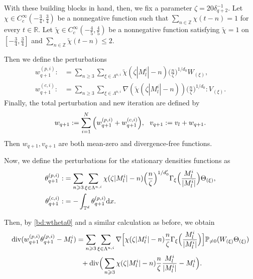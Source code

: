 \documentclass[UTF-8,reqno]{amsart}
\numberwithin{equation}{section}
\theoremstyle{definition}
\def\[{{\Big[}}
\def\]{{\Big]}}
\def\({{\Big(}}
\def\){{\Big)}}
\def\dif{{\mathord{{\rm d}}}}
\def\mP{{\mathbb P}}
\def\geq{\geqslant}
\def\leq{\leqslant}
\def\div{\mathord{{\rm div}}}
\def\[{{\Big[}}
\def\]{{\Big]}}
\def\({{\Big(}}
\def\){{\Big)}}
\def\dif{{\mathord{{\rm d}}}}
\def\geq{\geqslant}
\def\leq{\leqslant}
\def\div{\mathord{{\rm div}}}
\begin{document}
With these building blocks in hand, then, we fix a  parameter $\zeta = 20\delta_{q+2}^{-1}$.  Let
$
\chi\in C_c^\infty(-\frac34,\frac34)
$
be a nonnegative function such that
$
\sum_{n\in\mathbb{Z}}\chi(t-n)=1
$
for every $t\in\mathbb{R}$.
Let
$
\tilde{\chi}\in C_c^\infty(-\frac45,\frac45)
$
be a nonnegative function satisfying
$
\tilde{\chi}=1
$
on
$
[-\frac34,\frac34]
$
and
$
\sum_{n\in\mathbb{Z}}\tilde{\chi}(t-n)\leq2.
$

Then we define the perturbations
\begin{align*}
w_{q+1}^{(p,i)}:&=\sum_{n\geq3}\sum_{\xi\in\Lambda^{n,i}}\tilde{\chi}(\zeta |M^i_l|-n)\(\frac{n}{\zeta }\)^{1/d_0}W_{ (\xi)},\\
w_{q+1}^{(c,i)}:&=\sum_{n\geq3}\sum_{\xi\in\Lambda^{n,i}}\nabla( \tilde{\chi}(\zeta |M^i_l|-n))\(\frac{n}{\zeta }\)^{1/{d_0}}:V_{ (\xi)}.
\end{align*}
Finally, the total perturbation and new iteration are defined by
\begin{align}
w_{q+1}:=\sum_{i=1}^N\(w_{q+1}^{(p,i)}+w_{q+1}^{(c,i)}\),\ \ v_{q+1}:=v_l+w_{q+1}.\notag
\end{align} 
Then  $w_{q+1},v_{q+1}$ are both mean-zero and divergence-free functions.

 
Now,  we define the perturbations for the stationary  densities functions as
\begin{align}
\theta_{q+1}^{(p,i)}:&=
\sum_{n\geq3}\sum_{\xi\in\Lambda^{n,i}}\chi(\zeta |M^i_l|-n)\(\frac{n}{\zeta }\)^{1/{d_0'}}\Gamma_{\xi}\(\frac{M^i_l}{|M^i_l|}\)\Theta_{ (\xi)},\notag\\
\theta_{q+1}^{(c,i)}:&=-\int_{\mathbb{T}^d} \theta_{q+1}^{(p,i)}\dif x.\notag
\end{align}

Then, by \eqref{bd:wtheta0} and  a similar calculation as before, we obtain 
\begin{align}
 \div (w_{q+1}^{(p,i)}\theta_{q+1}^{(p,i)}-M^i_l)
&=\sum_{n\geq3}\sum_{\xi\in\Lambda^{n,i}}\nabla\[\chi(\zeta |M^i_l|-n)\frac{n}{\zeta }\Gamma_{\xi}\(\frac{M^i_l}{|M^i_l|}\)\]\mP_{\neq0}(W_{ (\xi)}\Theta_{ (\xi)})\notag\\
 &\ \ +\div \(\sum_{n\geq3}\chi(\zeta |M^i_l|-n)\frac{n}{\zeta }\frac{M^i_l}{|M^i_l|}-M^i_l\). \label{wthetagood}
\end{align} 
\end{document}
